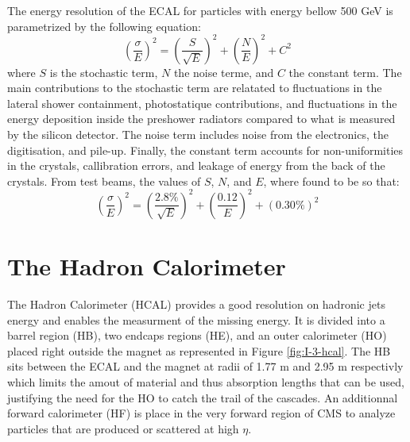     The energy resolution of the ECAL for particles with energy bellow 500 GeV is parametrized by the following equation:
    \begin{equation}
      \left( \frac{\sigma}{E} \right)^2 = \left( \frac{S}{\sqrt{E}} \right)^2 + \left( \frac{N}{E} \right)^2 + C^2
    \end{equation}
    where $ S $ is the stochastic term, $ N $ the noise terme, and $ C $ the constant term. The main contributions to the stochastic term are relatated to fluctuations in the lateral shower containment, photostatique contributions, and fluctuations in the energy deposition inside the preshower radiators compared to what is measured by the silicon detector. The noise term includes noise from the electronics, the digitisation, and pile-up. Finally, the constant term accounts for non-uniformities in the crystals, callibration errors, and leakage of energy from the back of the crystals. From test beams, the values of $ S $, $ N $, and $ E $, where found to be so that: \\
    \begin{equation}
      \left( \frac{\sigma}{E} \right)^2 = \left( \frac{2.8\%}{\sqrt{E}} \right)^2 + \left( \frac{0.12}{E} \right)^2 + (0.30\%)^2
    \end{equation}

  \section{The Hadron Calorimeter}

    The Hadron Calorimeter (HCAL) provides a good resolution on hadronic jets energy and enables the measurment of the missing energy. It is divided into a barrel region (HB), two endcaps regions (HE), and an outer calorimeter (HO) placed right outside the magnet as represented in Figure \ref{fig:I-3-hcal}. The HB sits between the ECAL and the magnet at radii of 1.77 m and 2.95 m respectivly which limits the amout of material and thus absorption lengths that can be used, justifying the need for the HO to catch the trail of the cascades. An additionnal forward calorimeter (HF) is place in the very forward region of CMS to analyze particles that are produced or scattered at high $ \eta $. \\

